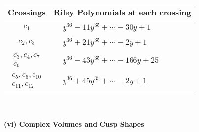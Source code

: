 \documentclass[1p]{elsarticle_modified}
\theoremstyle{definition}
\begin{document}
\begin{tabular}{m{50pt}|m{274pt}}
Crossings & \hspace{64pt}Riley Polynomials at each crossing \\
\hline $$\begin{aligned}c_{1}\end{aligned}$$&$\begin{aligned}
&y^{36}-11 y^{35}+\cdots-30 y+1
\end{aligned}$\\
\hline $$\begin{aligned}c_{2},c_{8}\end{aligned}$$&$\begin{aligned}
&y^{36}+21 y^{35}+\cdots-2 y+1
\end{aligned}$\\
\hline $$\begin{aligned}c_{3},c_{4},c_{7}\\c_{9}\end{aligned}$$&$\begin{aligned}
&y^{36}-43 y^{35}+\cdots-166 y+25
\end{aligned}$\\
\hline $$\begin{aligned}c_{5},c_{6},c_{10}\\c_{11},c_{12}\end{aligned}$$&$\begin{aligned}
&y^{36}+45 y^{35}+\cdots-2 y+1
\end{aligned}$\\
\hline
\end{tabular}\\~\\
\newpage\flushleft \textbf{(vi) Complex Volumes and Cusp Shapes}
\end{document}
